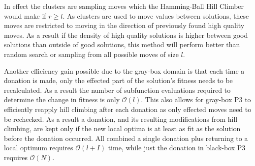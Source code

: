 \documentclass{sig-alternate}
\newcommand{\BigO}[1]{$\mathcal{O}{(#1)}$}
\begin{document}
In effect the clusters are sampling moves which the Hamming-Ball Hill Climber
would make if $r \ge l$. As clusters are used to move values between solutions, these
moves are restricted to moving in the direction of previously found high quality moves.
As a result if the density of high quality solutions is higher between good solutions than
outside of good solutions, this method will perform better than random search or sampling from
all possible moves of size $l$.

\begin{comment}
Figure~\ref{fig-sfx-tree} provides an efficient method for creating a linkage
tree similar to that used in black-box P3 given subfunction information.
Each variable starts in its own cluster. Each subfunction in a random order
is used to determine how to link existing clusters. If a subfunction overlaps
multiple top level clusters, all overlapped clusters are merged to create a new
top level cluster. This process creates a linkage tree similar to that learned
for P3, with the difference that a node in the tree can have up to $k$ children.

\Call{SubfunctionTree}{} requires \BigO{|cluster|} time to construct each $cluster$
in the linkage tree. In the gray-box domain the total number of subfunctions is required
to be $\Theta(N)$ in order to ensure the problem is not separable. As all variables must
participate in a subfunction, $\Theta(N)$ clusters must be created. Therefore
the only cost which cannot be amortized over the clusters to \BigO{1} is the creation
of each new $cluster$, leading to a time of \BigO{|cluster|} per $cluster$.

This method of constructing clusters has a number of desirable properties beyond its
efficiency. As all non-linear relationships are denoted by subfunctions, mixing
complete subfunctions between individuals has a high likelihood of preserving quality.
Each cluster contains at least one entire subfunction, and two
clusters must differ by at least one entire subfunction. The probability two
variables appear in the same cluster increases with the number of subfunctions
they share. The more paths that exist between two variables in the subfunction
connectivity graph, the more likely those variables will appear in the same cluster.
\end{comment}

Another efficiency gain possible due to the gray-box domain is that each time a
donation is made, only the effected part of the solution's fitness needs to be
recalculated. As a result the number of subfunction evaluations required
to determine the change in fitness is only \BigO{l}. This also
allows for gray-box P3 to efficiently reapply hill climbing after each
donation as only effected moves need to be rechecked. As a result a donation,
and its resulting modifications from hill climbing, are kept only if the
new local optima is at least as fit as the solution before the donation occurred.
All combined a single donation plus returning to a local optimum requires \BigO{l + I} time,
while just the donation in black-box P3 requires \BigO{N}.
\end{document}
